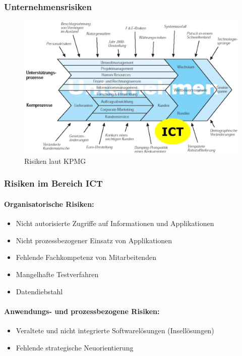 \documentclass[10pt,a4paper]{article}
\begin{document}
\subsubsection*{Unternehmensrisiken}
\begin{figure}[H]
    \begin{center}
    \includegraphics[width=13cm]{images/KPMG_Risiken.png}
    \caption{Risiken laut KPMG}
    \label{KPMG Unternehmensrisiken}
    \end{center}
\end{figure}

\subsubsection*{Risiken im Bereich ICT}

\paragraph*{Organisatorische Risiken:}
\begin{itemize}[noitemsep,topsep=0pt,leftmargin=*]
    \item Nicht autorisierte Zugriffe auf Informationen und
    Applikationen
    \item Nicht prozessbezogener Einsatz von Applikationen
    \item Fehlende Fachkompetenz von Mitarbeitenden
    \item Mangelhafte Testverfahren
    \item Datendiebstahl
\end{itemize}

\paragraph*{Anwendungs- und prozessbezogene Risiken:}
\begin{itemize}[noitemsep,topsep=0pt,leftmargin=*]
    \item Veraltete und nicht integrierte Softwarelösungen
    (Insellösungen)
    \item Fehlende strategische Neuorientierung
\end{itemize}
\end{document}
